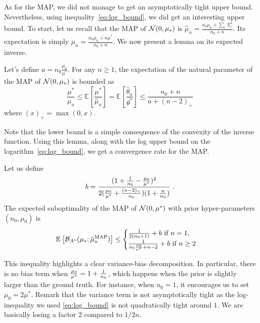 \documentclass{article}
\newcommand*{\expect}[2][]{\ensuremath{\mathbb{E}_{#1} \left[ #2 \right] }} %
\newcommand{\logpart}{A}
\newcommand{\bregmanconj}{\cB_{\logpart^*}}
\newcommand{\natp}{\theta}
\newcommand{\MAPm}{\hat \mu_n}
\newcommand{\MAPt}{\hat \natp_n}
\begin{document}
As for the MAP, we did not manage to get an asymptotically tight upper bound. Nevertheless, using inequality~\eqref{eq:log_bound}, we did get an interesting upper bound. 
To start, let us recall that the MAP of ${\mathcal N}(0,\mu_*)$ is $\hat \mu_n = \frac{n_0 \mu_0 + \sum_i X_i^2}{n_0 + n}$.
Its expectation is simply $\mu_n= \frac{n_0 \mu_0 + n \mu^*}{n_0 + n}$.
We now present a lemma on its expected inverse.
\begin{lemma}
	Let's define $a=n_0 \frac {\mu_0 }{ \mu^* }$. For any $n\geq 1$, the expectation of the natural parameter of the MAP of ${\mathcal N}(0,\mu_*)$ is bounded as
	\begin{equation}
		\frac{\mu^*}{\mu_n}
		\leq \expect{\frac{\mu^*}{\MAPm}} 
		= \expect{\frac{\MAPt}{\natp^*}} 
		\leq \frac{n_0 +n}{a+ (n-2)_+}
		\label{eq:theta_expectation_bound}
	\end{equation}
	where $(x)_+ = \max(0,x)$.
\end{lemma}
Note that the lower bound is a simple consequence of the convexity of the inverse function. 
Using this lemma, along with the log upper bound on the logarithm~\eqref{eq:log_bound}, we get a convergence rate for the MAP. 
\begin{example}
\begin{theorem}
 Let us  define
 \begin{align}
	b = \frac{(1 + \frac{1}{n_0} - \frac{\mu_0}{\mu^*})^2}{2 (\frac{\mu_0}{\mu^*}+\frac{(n-2)_+}{n_0})(1 + \frac{n}{n_0} )} \; .
 \end{align}
The expected suboptimality of the MAP of ${\mathcal N}(0,\mu^*)$ with prior hyper-parameters $(n_0,\mu_0)$ is
 \begin{equation}
	\expect{\bregmanconj( \mu_*; \hat \mu_n^\text{MAP})}
	\leq \begin{cases}
		\inv{2(n_0+1)}  +  b\ \text{if}\ n=1,\\
		\frac{1}{n_0 \frac{\mu_0}{\mu^*} +n-2} + b \ \text{if}\ n\geq 2
	\end{cases}
	\label{eq:MAP_rate}
\end{equation}
\end{theorem}
\end{example}
This inequality highlights a clear variance-bias decomposition.
In particular, there is no bias term when $\frac{\mu_0}{\mu^*} =1 + \frac{1}{n_0} $, which happens when the prior is slightly larger than the ground truth.  For instance, when $n_0=1$, it encourages us to set $\mu_0 = 2 \mu^*$.
Remark that the variance term is not asymptotically tight as the log-inequality we used \eqref{eq:log_bound} is not quadratically tight around $1$. We are basically losing a factor 2 compared to $1/2n$.
\end{document}

